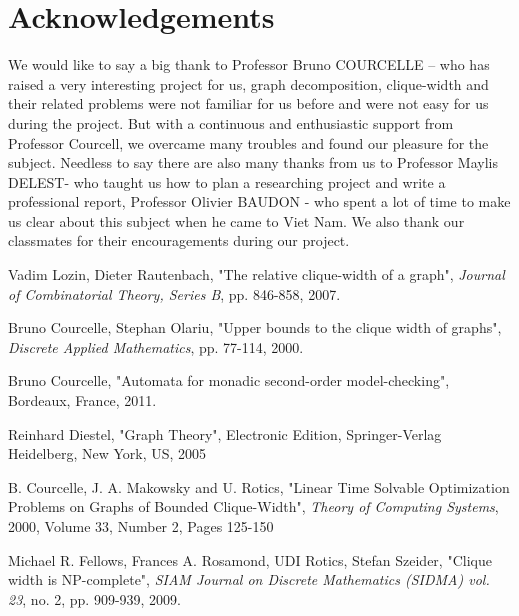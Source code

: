 \documentclass[a4paper, 12pt]{article}
\begin{document}
\section {Acknowledgements}
We would like to say a big thank to Professor Bruno COURCELLE – who has raised a very interesting project for us, graph decomposition, clique-width and their related problems were not familiar for us before and were not easy for us during the project. But with a continuous and enthusiastic support from Professor Courcell, we overcame many troubles and found our pleasure for the subject.\newline\newline
Needless to say there are also many thanks from us  to Professor Maylis DELEST- who taught us how to plan a researching project and write a professional report, Professor Olivier BAUDON - who spent a lot of time to make us clear about this subject when he came to Viet Nam.\newline\newline
We also thank our classmates for their encouragements during our project.

\begin{thebibliography}{99}


  Vadim Lozin, Dieter Rautenbach, "The relative clique-width of a graph", \textit{Journal of Combinatorial Theory, Series B}, pp. 846-858, 2007.

 Bruno Courcelle, Stephan Olariu, "Upper bounds to the clique width of graphs", \textit{Discrete Applied Mathematics}, pp. 77-114, 2000.

 Bruno Courcelle, "Automata for monadic second-order model-checking", Bordeaux, France, 2011.

 Reinhard Diestel, "Graph Theory", Electronic Edition, Springer-Verlag Heidelberg, New York, US, 2005

 B. Courcelle, J. A. Makowsky and U. Rotics, "Linear Time Solvable Optimization Problems on Graphs of Bounded Clique-Width", \textit {Theory of Computing Systems}, 2000, Volume 33, Number 2, Pages 125-150

 Michael R. Fellows, Frances A. Rosamond, UDI Rotics, Stefan Szeider, "Clique width is NP-complete", \textit {SIAM Journal on Discrete Mathematics (SIDMA) vol. 23}, no. 2, pp. 909-939, 2009. 
\end{thebibliography}
\end{document}

